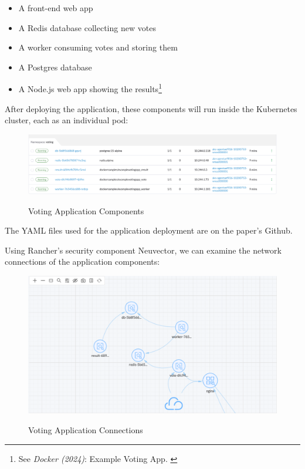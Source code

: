 \begin{itemize}
    \item A front-end web app
    \item A Redis database collecting new votes
    \item A worker consuming votes and storing them
    \item A Postgres database
    \item A Node.js web app showing the results\footnote{See \textit{Docker (2024)}: Example Voting App. \cite{votingGithub}}
\end{itemize}

After deploying the application, these components will run inside the Kubernetes cluster, each as an individual pod:

\begin{figure}[H]
\centering
\caption {Voting Application Components}
\includegraphics[width=\linewidth]{images/voting-pods.png}
\label{fig:votingPods}
\end{figure}

The YAML files used for the application deployment are on the paper's Github.

Using Rancher's security component Neuvector, we can examine the network connections of the application components:

\begin{figure}[H]
\centering
\caption {Voting Application Connections}
\includegraphics[width=\linewidth]{images/voting-map.png}
\label{fig:votingMap}
\end{figure}

